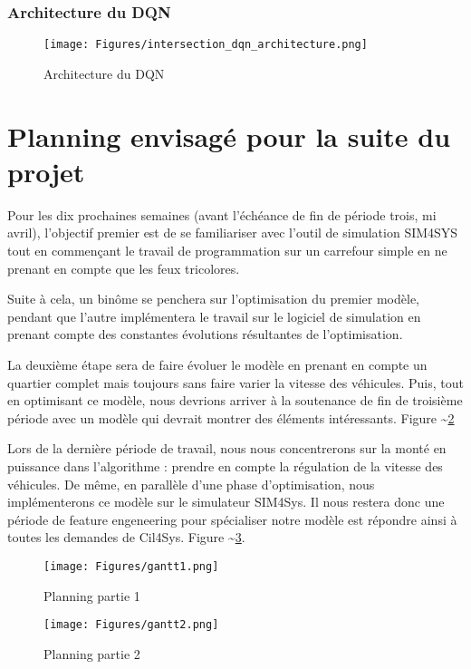\documentclass[11pt]{article}
\begin{document}
\subsubsection{Architecture du DQN}
\label{sec:orga3abc52}

\begin{figure}[ht]
\centering
\texttt{[image: Figures/intersection\_dqn\_architecture.png]}
\caption[intersection-dqn-architecture]{Architecture du DQN}
\label{fig:intersection-dqn-architecture}
\end{figure}

\section{Planning envisagé pour la suite du projet}
\label{sec:org11963fb}

Pour les dix prochaines semaines (avant l'échéance de fin de période trois, mi avril), l'objectif premier est de se familiariser avec l'outil de simulation SIM4SYS tout en commençant le travail de programmation sur un carrefour simple en ne prenant en compte que les feux tricolores.

Suite à cela, un binôme se penchera sur l'optimisation du premier modèle, pendant que l'autre implémentera le travail sur le logiciel de simulation en prenant compte des constantes évolutions résultantes de l'optimisation.

La deuxième étape  sera de faire évoluer le modèle en prenant en compte un quartier complet mais toujours sans faire varier la vitesse des véhicules. Puis, tout en optimisant ce modèle, nous devrions arriver à la soutenance de fin de troisième période avec un modèle qui devrait montrer des éléments intéressants. Figure \textasciitilde{}\ref{fig:gantt-1}

Lors de la dernière période de travail, nous nous concentrerons sur la monté en puissance dans l'algorithme : prendre en compte la régulation de la vitesse des véhicules. De même, en parallèle d'une phase d'optimisation, nous implémenterons ce modèle sur le simulateur SIM4Sys. Il nous restera donc une période de feature engeneering pour spécialiser notre modèle est répondre ainsi à toutes les demandes de Cil4Sys. Figure \textasciitilde{}\ref{fig:gantt-2}.

\begin{latex}
\newpage
\begin{figure}
\centering
\texttt{[image: Figures/gantt1.png]}
\caption[gantt-1]{Planning partie 1}
\label{fig:gantt-1}
\end{figure}

\newpage
\begin{figure}
\centering
\texttt{[image: Figures/gantt2.png]}
\caption[gantt-2]{Planning partie 2}
\label{fig:gantt-2}
\end{figure}

\newpage
\end{latex}
\end{document}
